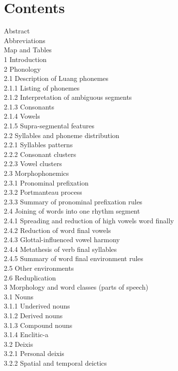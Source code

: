 \documentclass[10pt]{article}
\begin{document}
\section*{Contents}
Abstract\\
Abbreviations\\
Map and Tables\\
1 Introduction\\
2 Phonology\\
2.1 Description of Luang phonemes\\
2.1.1 Listing of phonemes\\
2.1.2 Interpretation of ambiguous segments\\
2.1.3 Consonants\\
2.1.4 Vowels\\
2.1.5 Supra-segmental features\\
2.2 Syllables and phoneme distribution\\
2.2.1 Syllables patterns\\
2.2.2 Consonant clusters\\
2.2.3 Vowel clusters\\
2.3 Morphophonemics\\
2.3.1 Pronominal prefixation\\
2.3.2 Portmanteau process\\
2.3.3 Summary of pronominal prefixation rules\\
2.4 Joining of words into one rhythm segment\\
2.4.1 Spreading and reduction of high vowels word finally\\
2.4.2 Reduction of word final vowels\\
2.4.3 Glottal-influenced vowel harmony\\
2.4.4 Metathesis of verb final syllables\\
2.4.5 Summary of word final environment rules\\
2.5 Other environments\\
2.6 Reduplication\\
3 Morphology and word classes (parts of speech)\\
3.1 Nouns\\
3.1.1 Underived nouns\\
3.1.2 Derived nouns\\
3.1.3 Compound nouns\\
3.1.4 Enclitic-a\\
3.2 Deixis\\
3.2.1 Personal deixis\\
3.2.2 Spatial and temporal deictics\\
\end{document}
